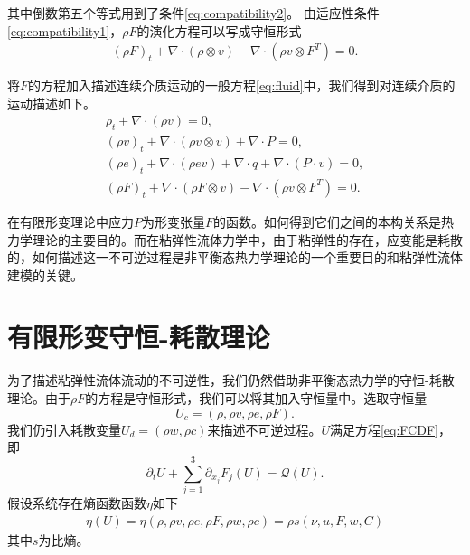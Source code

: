 \documentclass{article}
\begin{document}
其中倒数第五个等式用到了条件\eqref{eq:compatibility2}。
由适应性条件\eqref{eq:compatibility1}，$\rho F$的演化方程可以写成守恒形式
\begin{eqnarray*}
(\rho F)_t + \nabla \cdot (\rho \otimes v) - \nabla \cdot (\rho v \otimes F^T) = 0 .
\end{eqnarray*} 

将$F$的方程加入描述连续介质运动的一般方程\eqref{eq:fluid}中，我们得到对连续介质的运动描述如下。
\begin{subequations}\label{eq:continuum}
\begin{align}
\rho_t + \nabla \cdot (\rho v )=0, \\
(\rho v)_t + \nabla \cdot (\rho v \otimes v) + \nabla \cdot P = 0, \\
(\rho e)_t + \nabla \cdot (\rho e v) + \nabla \cdot q + \nabla \cdot (P \cdot v) = 0 ,\\
(\rho F)_t + \nabla \cdot (\rho F \otimes v) - \nabla \cdot (\rho v \otimes F^T) = 0 .
\end{align}
\end{subequations}

在有限形变理论中应力$P$为形变张量$F$的函数。如何得到它们之间的本构关系是热力学理论的主要目的。而在粘弹性流体力学中，由于粘弹性的存在，应变能是耗散的，如何描述这一不可逆过程是非平衡态热力学理论的一个重要目的和粘弹性流体建模的关键。

\section{有限形变守恒-耗散理论}
为了描述粘弹性流体流动的不可逆性，我们仍然借助非平衡态热力学的守恒-耗散理论。由于$\rho F$的方程是守恒形式，我们可以将其加入守恒量中。选取守恒量
$$U_c = (\rho, \rho v, \rho e, \rho F).$$
我们仍引入耗散变量$U_d = (\rho w,\rho c)$来描述不可逆过程。$U$满足方程\eqref{eq:FCDF}，即
\begin{equation}\label{eq:FCDF}
		\partial_t U + \sum_{j=1}^3 \partial_{x_j} F_j(U) = \mathcal{Q} (U) .
\end{equation}
假设系统存在熵函数函数$\eta$如下
\begin{eqnarray*}
\eta(U) = \eta(\rho, \rho v, \rho e,\rho F,\rho w, \rho c) = \rho s(\nu,u,F,w,C)
\end{eqnarray*}
其中$s$为比熵。
\end{document}
